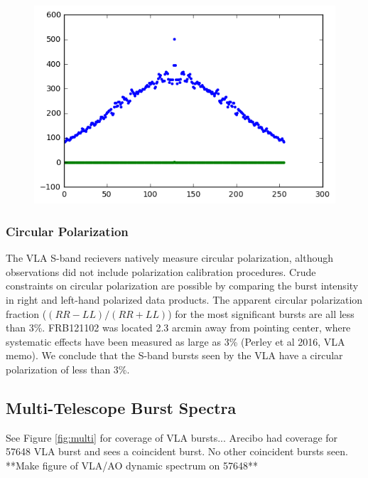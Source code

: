 \documentclass{emulateapj}
\begin{document}
\begin{figure}[htb]
\begin{center}
\includegraphics[width=0.9\columnwidth]{acf_57633_scan7}
\caption{
\label{fig:acf}}
\end{center}
\end{figure}

\subsubsection{Circular Polarization}
The VLA S-band recievers natively measure circular polarization, although observations did not include polarization calibration procedures. Crude constraints on circular polarization are possible by comparing the burst intensity in right and left-hand polarized data products. The apparent circular polarization fraction ($(RR-LL)/(RR+LL)$) for the most significant bursts are all less than 3\%. FRB121102 was located 2.3 arcmin away from pointing center, where systematic effects have been measured as large as 3\% (Perley et al 2016, VLA memo). We conclude that the S-band bursts seen by the VLA have a circular polarization of less than 3\%.

\subsection{Multi-Telescope Burst Spectra}
See Figure \ref{fig:multi} for coverage of VLA bursts... Arecibo had coverage for 57648 VLA burst and sees a coincident burst. No other coincident bursts seen. **Make figure of VLA/AO dynamic spectrum on 57648**

\end{document}
